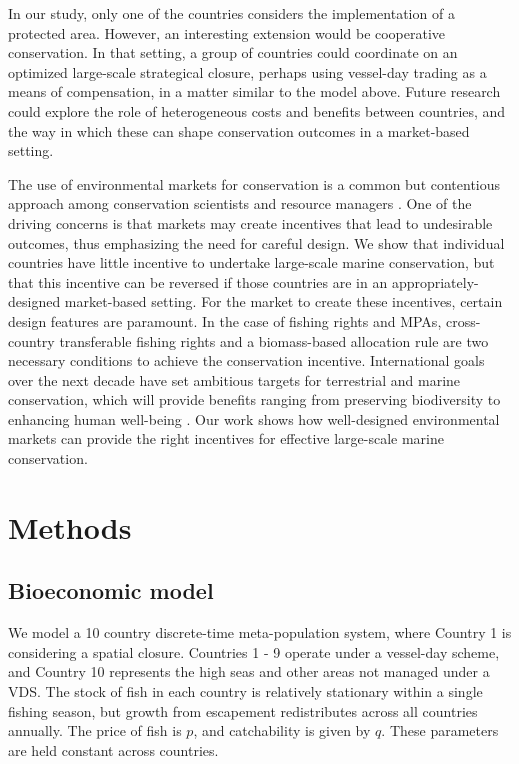 \documentclass[12pt]{article}
\begin{document}
In our study, only one of the countries considers the implementation of a protected area. However, an interesting extension would be cooperative conservation. In that setting, a group of countries could coordinate on an optimized large-scale strategical closure, perhaps using vessel-day trading as a means of compensation, in a matter similar to the model above. Future research could explore the role of heterogeneous costs and benefits between countries, and the way in which these can shape conservation outcomes in a market-based setting.

The use of environmental markets for conservation is a common but contentious approach among conservation scientists and resource managers \cite{sandbrook_2019}. One of the driving concerns is that markets may create incentives that lead to undesirable outcomes, thus emphasizing the need for careful design. We show that individual countries have little incentive to undertake large-scale marine conservation, but that this incentive can be reversed if those countries are in an appropriately-designed market-based setting. For the market to create these incentives, certain design features are paramount. In the case of fishing rights and MPAs, cross-country transferable fishing rights and a biomass-based allocation rule are two necessary conditions to achieve the conservation incentive. International goals over the next decade have set ambitious targets for terrestrial and marine conservation, which will provide benefits ranging from preserving biodiversity to enhancing human well-being \cite{oleary_2016,dinerstein_2019,roberts_2017,ban_2019}. Our work shows how well-designed environmental markets can provide the right incentives for effective large-scale marine conservation.

\clearpage

\section{Methods}

\subsection{Bioeconomic model}

We model a 10 country discrete-time meta-population system, where Country 1 is considering a spatial closure. Countries 1 - 9 operate under a vessel-day scheme, and Country 10 represents the high seas and other areas not managed under a VDS. The stock of fish in each country is relatively stationary within a single fishing season, but  growth from escapement redistributes across all countries annually. The price of fish is $p$, and catchability is given by $q$. These parameters are held constant across countries.
\end{document}
